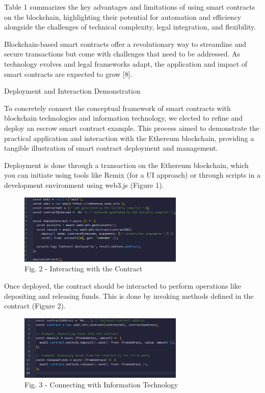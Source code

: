 \begin{multicols}{2}
Table 1 summarizes the key advantages and limitations of using smart
contracts on the blockchain, highlighting their potential for automation
and efficiency alongside the challenges of technical complexity, legal
integration, and flexibility.

Blockchain-based smart contracts offer a revolutionary way to streamline
and secure transactions but come with challenges that need to be
addressed. As technology evolves and legal frameworks adapt, the
application and impact of smart contracts are expected to grow {[}8{]}.

Deployment and Interaction Demonstration

To concretely connect the conceptual framework of smart contracts with
blockchain technologies and information technology, we elected to refine
and deploy an escrow smart contract example. This process aimed to
demonstrate the practical application and interaction with the Ethereum
blockchain, providing a tangible illustration of smart contract
deployment and management.

Deployment is done through a transaction on the Ethereum blockchain,
which you can initiate using tools like Remix (for a UI approach) or
through scripts in a development environment using web3.js (Figure 1).
\end{multicols}

\begin{figure}[H]
	\centering
	\includegraphics[width=0.7\textwidth]{assets/79}
	\caption*{Fig. 2 - Interacting with the Contract}
\end{figure}

Once deployed, the contract should be interacted to perform operations
like depositing and releasing funds. This is done by invoking methods
defined in the contract (Figure 2).

\begin{figure}[H]
	\centering
	\includegraphics[width=0.7\textwidth]{assets/80}
	\caption*{Fig. 3 - Connecting with Information Technology}
\end{figure}

